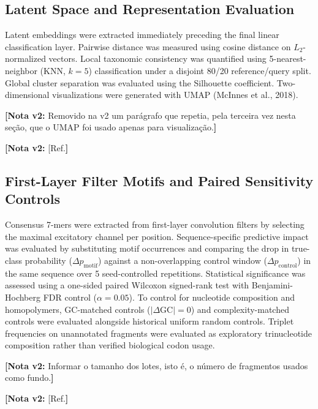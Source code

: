 \documentclass[11pt,a4paper]{article}
\newcommand{\notavdois}[1]{\par\vspace{0.4em}\noindent\colorbox{yellow!25}{\begin{minipage}{0.96\linewidth}\footnotesize\textbf{[Nota v2:} #1\textbf{]}\end{minipage}}\par\vspace{0.4em}}
\begin{document}
\subsection{Latent Space and Representation Evaluation}
Latent embeddings were extracted immediately preceding the final linear classification layer. Pairwise distance was measured using cosine distance on $L_2$-normalized vectors. Local taxonomic consistency was quantified using 5-nearest-neighbor (KNN, $k=5$) classification under a disjoint 80/20 reference/query split. Global cluster separation was evaluated using the Silhouette coefficient. Two-dimensional visualizations were generated with UMAP (McInnes et al., 2018).

\notavdois{Removido na v2 um parágrafo que repetia, pela terceira vez nesta seção, que o UMAP foi usado apenas para visualização.}


\notavdois{[Ref.}


\subsection{First-Layer Filter Motifs and Paired Sensitivity Controls}
Consensus 7-mers were extracted from first-layer convolution filters by selecting the maximal excitatory channel per position. Sequence-specific predictive impact was evaluated by substituting motif occurrences and comparing the drop in true-class probability ($\Delta p_{\text{motif}}$) against a non-overlapping control window ($\Delta p_{\text{control}}$) in the same sequence over 5 seed-controlled repetitions. Statistical significance was assessed using a one-sided paired Wilcoxon signed-rank test with Benjamini-Hochberg FDR control ($\alpha=0.05$).
To control for nucleotide composition and homopolymers, GC-matched controls ($|\Delta\text{GC}| = 0$) and complexity-matched controls were evaluated alongside historical uniform random controls. Triplet frequencies on unannotated fragments were evaluated as exploratory trinucleotide composition rather than verified biological codon usage.

\notavdois{Informar o tamanho dos lotes, isto é, o número de fragmentos usados como fundo.}


\notavdois{[Ref.}
\end{document}
